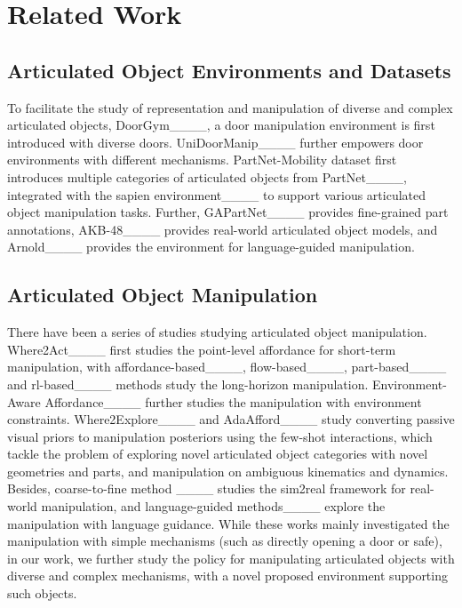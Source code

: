 \section{Related Work}
\vspace{-0.1cm}

\subsection{Articulated Object Environments and Datasets}
\vspace{-0.2cm}


To facilitate the study of representation and manipulation of diverse and complex articulated objects,
DoorGym____, a door manipulation environment is first introduced with diverse doors.
UniDoorManip____ further empowers door environments with different mechanisms.
PartNet-Mobility dataset first introduces multiple categories of articulated objects from PartNet____, integrated with the sapien environment____ to support various articulated object manipulation tasks. 
Further, GAPartNet____ provides fine-grained part annotations, AKB-48____ provides real-world articulated object models, and Arnold____ provides the environment for language-guided manipulation.

\vspace{-0.2cm}
\subsection{Articulated Object Manipulation}
\vspace{-0.2cm}

There have been a series of studies studying articulated object manipulation.
Where2Act____ first studies the point-level affordance for short-term manipulation,
with affordance-based____, flow-based____, part-based____ and rl-based____ methods study the long-horizon manipulation.
Environment-Aware Affordance____ further studies the manipulation with environment constraints.
Where2Explore____ and AdaAfford____ study converting passive visual priors to manipulation posteriors using the few-shot interactions, which tackle the problem of exploring novel articulated object categories with novel geometries and parts, and manipulation on ambiguous kinematics and dynamics. 
Besides, coarse-to-fine method ____ studies the sim2real framework for real-world manipulation, and language-guided methods____ explore the manipulation with language guidance.
While these works mainly investigated the manipulation with simple mechanisms (such as directly opening a door or safe), in our work,
we further study the policy for manipulating articulated objects with diverse and complex mechanisms, with a novel proposed environment supporting such objects.

\vspace{-0.2cm}